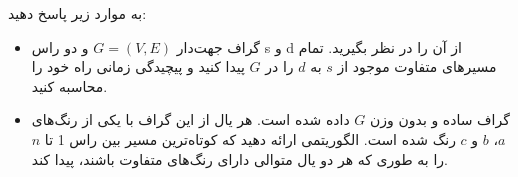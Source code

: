 به موارد زیر پاسخ دهید:
\begin{itemize}
\item
گراف جهت‌دار $G = (V, E)$ و دو راس s و d از آن را در نظر بگیرید. تمام مسیرهای متفاوت موجود از $s$ به $d$ را در $G$ پیدا کنید و پیچیدگی زمانی راه خود را محاسبه کنید.
\item
گراف ساده و بدون وزن $G$ داده شده است. هر یال از این گراف با یکی از رنگ‌های $a$، $b$ و $c$ رنگ شده است. الگوریتمی ارائه دهید که کوتاه‌ترین مسیر بین راس 1 تا $n$ را به طوری که هر دو یال متوالی دارای رنگ‌های متفاوت باشند، پیدا کند.
\end{itemize}